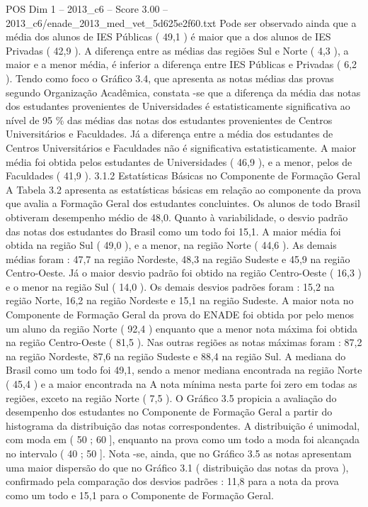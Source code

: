 \begin{textsample}{POS Dim 1 – 2013\_c6 – Score 3.00 – 2013\_c6/enade\_2013\_med\_vet\_5d625e2f60.txt}
Pode ser observado ainda que a média dos alunos de IES Públicas ( 49,1 ) é maior que a dos alunos de IES Privadas ( 42,9 ).
A diferença entre as médias das regiões Sul e Norte ( 4,3 ), a maior e a menor média, é inferior a diferença entre IES Públicas e Privadas ( 6,2 ).
Tendo como foco o Gráfico 3.4, que apresenta as notas médias das provas segundo Organização Acadêmica, constata -se que a diferença da média das notas dos estudantes provenientes de Universidades é estatisticamente significativa ao nível de 95 \% das médias das notas dos estudantes provenientes de Centros Universitários e Faculdades.
Já a diferença entre a média dos estudantes de Centros Universitários e Faculdades não é significativa estatisticamente.
A maior média foi obtida pelos estudantes de Universidades ( 46,9 ), e a menor, pelos de Faculdades ( 41,9 ). 3.1.2 Estatísticas Básicas no Componente de Formação Geral A Tabela 3.2 apresenta as estatísticas básicas em relação ao componente da prova que avalia a Formação Geral dos estudantes concluintes.
Os alunos de todo Brasil obtiveram desempenho médio de 48,0.
Quanto à variabilidade, o desvio padrão das notas dos estudantes do Brasil como um todo foi 15,1.
A maior média foi obtida na região Sul ( 49,0 ), e a menor, na região Norte ( 44,6 ).
As demais médias foram : 47,7 na região Nordeste, 48,3 na região Sudeste e 45,9 na região Centro-Oeste.
Já o maior desvio padrão foi obtido na região Centro-Oeste ( 16,3 ) e o menor na região Sul ( 14,0 ).
Os demais desvios padrões foram : 15,2 na região Norte, 16,2 na região Nordeste e 15,1 na região Sudeste.
A maior nota no Componente de Formação Geral da prova do ENADE foi obtida por pelo menos um aluno da região Norte ( 92,4 ) enquanto que a menor nota máxima foi obtida na região Centro-Oeste ( 81,5 ).
Nas outras regiões as notas máximas foram : 87,2 na região Nordeste, 87,6 na região Sudeste e 88,4 na região Sul.
A mediana do Brasil como um todo foi 49,1, sendo a menor mediana encontrada na região Norte ( 45,4 ) e a maior encontrada na A nota mínima nesta parte foi zero em todas as regiões, exceto na região Norte ( 7,5 ).
O Gráfico 3.5 propicia a avaliação do desempenho dos estudantes no Componente de Formação Geral a partir do histograma da distribuição das notas correspondentes.
A distribuição é unimodal, com moda em ( 50 ; 60 ], enquanto na prova como um todo a moda foi alcançada no intervalo ( 40 ; 50 ].
Nota -se, ainda, que no Gráfico 3.5 as notas apresentam uma maior dispersão do que no Gráfico 3.1 ( distribuição das notas da prova ), confirmado pela comparação dos desvios padrões : 11,8 para a nota da prova como um todo e 15,1 para o Componente de Formação Geral.

\end{textsample}
